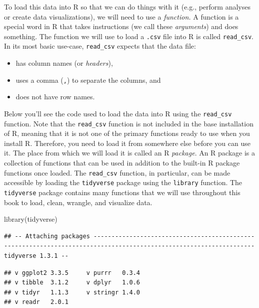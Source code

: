 \documentclass[
  12pt,
]{krantz}
\newenvironment{Shaded}{\begin{snugshade}}{\end{snugshade}}
\newcommand{\FunctionTok}[1]{\textcolor[rgb]{0,0,0}{#1}}
\newcommand{\NormalTok}[1]{#1}
\providecommand{\tightlist}{%
  \setlength{\itemsep}{0pt}\setlength{\parskip}{0pt}}
\begin{document}
To load this data into R so that we can do things with it (e.g., perform
analyses or create data visualizations), we will need to use a \emph{function.}  A
function is a special word in R that takes instructions (we call these
\emph{arguments})  and does something. The function we will use to load a \texttt{.csv} file
into R is called \texttt{read\_csv}.  In its most basic
use-case, \texttt{read\_csv} expects that the data file:

\begin{itemize}
\tightlist
\item
  has column names (or \emph{headers}),
\item
  uses a comma (\texttt{,}) to separate the columns, and
\item
  does not have row names.
\end{itemize}

Below you'll see the code used to load the data into R using the \texttt{read\_csv}
function. Note that the \texttt{read\_csv} function is not included in the base
installation of R, meaning that it is not one of the primary functions ready to
use when you install R. Therefore, you need to load it from somewhere else
before you can use it. The place from which we will load it is called an R \emph{package}.
An R package  is a collection of functions that can be used in addition to the
built-in R package functions once loaded. The \texttt{read\_csv} function, in
particular, can be made accessible by loading the \texttt{tidyverse} package \citep{wickham2019tidverse}
using the \texttt{library} function.  The \texttt{tidyverse}  package contains many
functions that we will use throughout this book to load, clean, wrangle,
and visualize data.

\begin{Shaded}
\begin{Highlighting}[]
\FunctionTok{library}\NormalTok{(tidyverse)}
\end{Highlighting}
\end{Shaded}

\begin{verbatim}
## -- Attaching packages ------------------------------------------------------------------------------------------------------------------- tidyverse 1.3.1 --
\end{verbatim}

\begin{verbatim}
## v ggplot2 3.3.5     v purrr   0.3.4
## v tibble  3.1.2     v dplyr   1.0.6
## v tidyr   1.1.3     v stringr 1.4.0
## v readr   2.0.1
\end{verbatim}
\end{document}
